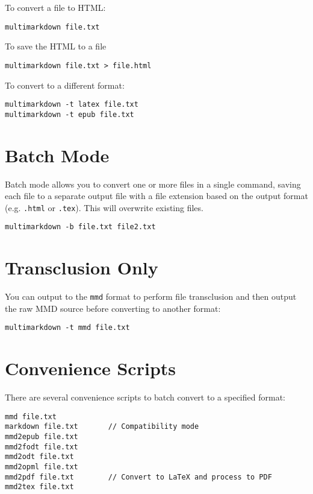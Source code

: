 To convert a file to HTML:

\begin{verbatim}
multimarkdown file.txt
\end{verbatim}

To save the HTML to a file

\begin{verbatim}
multimarkdown file.txt > file.html
\end{verbatim}

To convert to a different format:

\begin{verbatim}
multimarkdown -t latex file.txt
multimarkdown -t epub file.txt
\end{verbatim}

\section{Batch Mode}
\label{batchmode}

Batch mode allows you to convert one or more files in a single command, saving each file to a separate output file with a file extension based on the output format (e.g. \texttt{.html} or \texttt{.tex}). This will overwrite existing files.

\begin{verbatim}
multimarkdown -b file.txt file2.txt
\end{verbatim}

\section{Transclusion Only}
\label{transclusiononly}

You can output to the \texttt{mmd} format to perform file transclusion and then output the raw \gls{MMD} source before converting to another format:

\begin{verbatim}
multimarkdown -t mmd file.txt
\end{verbatim}

\section{Convenience Scripts}
\label{conveniencescripts}

There are several convenience scripts to batch convert to a specified format:

\begin{verbatim}
mmd file.txt
markdown file.txt		// Compatibility mode
mmd2epub file.txt
mmd2fodt file.txt
mmd2odt file.txt
mmd2opml file.txt
mmd2pdf file.txt		// Convert to LaTeX and process to PDF
mmd2tex file.txt
\end{verbatim}

